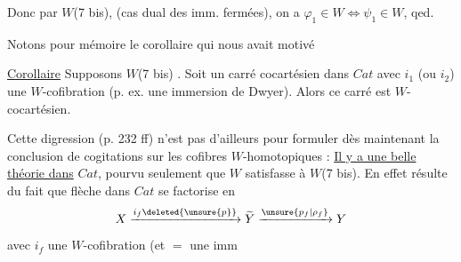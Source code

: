 Donc par $W$(7 bis), (cas dual  des imm. fermées), on a $\varphi_1\in W\Longleftrightarrow\psi_1\in W$, qed.

Notons pour mémoire le corollaire qui nous avait motivé

\uline{Corollaire} Supposons $W$(7 bis) . Soit un carré cocartésien dans $Cat$
avec $i_1$ (ou $i_2$) une $W$-cofibration (p. ex. une immersion de Dwyer). Alors ce carré est $W$-cocartésien.

Cette digression (p. 232 ff) n'est pas  d'ailleurs pour formuler dès maintenant la conclusion de  cogitations sur les cofibres $W$-homotopiques : \uline{Il y a une belle théorie dans} $Cat$, pourvu seulement que $W$ satisfasse à $W$(7 bis). En effet  résulte du fait que  flèche  dans $Cat$ se factorise en
\[
 X\xrightarrow{i_f\deleted{\unsure{p}}}\widetilde Y\xrightarrow{\unsure{p_f|\rho_f}}Y
\]
avec $i_f$ une $W$-cofibration (et $=$ une imm


